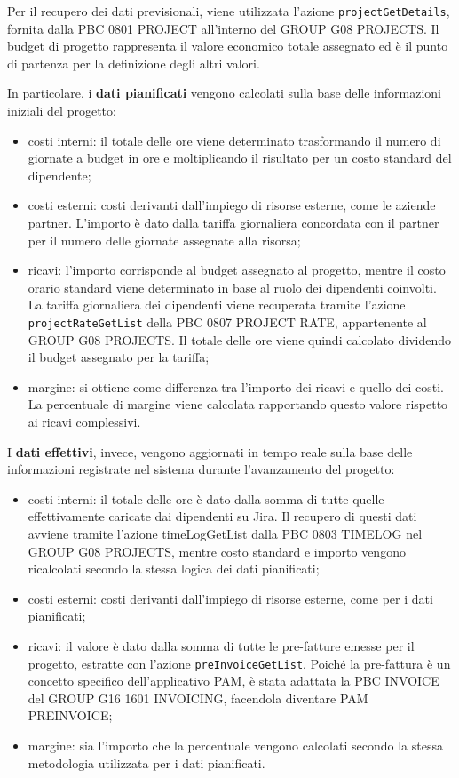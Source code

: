     Per il recupero dei dati previsionali, viene utilizzata l’azione \texttt{projectGetDetails}, fornita dalla PBC 0801 PROJECT
    all’interno del GROUP G08 PROJECTS. Il budget di progetto rappresenta il valore economico totale assegnato ed è
    il punto di partenza per la definizione degli altri valori.

    In particolare, i \textbf{dati pianificati} vengono calcolati sulla base delle informazioni iniziali del progetto:
    \begin{itemize}
        \item costi interni: il totale delle ore viene determinato trasformando il numero di giornate a budget in ore e
        moltiplicando il risultato per un costo standard del dipendente;
        \item costi esterni: costi derivanti dall’impiego di risorse esterne, come le aziende partner. L’importo è dato
        dalla tariffa giornaliera concordata con il partner per il numero delle giornate assegnate alla risorsa;
        \item ricavi: l’importo corrisponde al budget assegnato al progetto, mentre il costo orario standard viene
        determinato in base al ruolo dei dipendenti coinvolti. La tariffa giornaliera dei dipendenti viene recuperata
        tramite l’azione \texttt{projectRateGetList} della PBC 0807 PROJECT RATE, appartenente al GROUP G08 PROJECTS. Il totale
        delle ore viene quindi calcolato dividendo il budget assegnato per la tariffa;
        \item margine: si ottiene come differenza tra l’importo dei ricavi e quello dei costi. La percentuale di margine
        viene calcolata rapportando questo valore rispetto ai ricavi complessivi.
    \end{itemize}

    I \textbf{dati effettivi}, invece, vengono aggiornati in tempo reale sulla base delle informazioni registrate nel sistema
    durante l’avanzamento del progetto:
    \begin{itemize}
        \item costi interni: il totale delle ore è dato dalla somma di tutte quelle effettivamente caricate dai
        dipendenti su Jira. Il recupero di questi dati avviene tramite l’azione timeLogGetList dalla PBC 0803 TIMELOG
        nel GROUP G08 PROJECTS, mentre costo standard e importo vengono ricalcolati secondo la stessa logica dei dati pianificati;
        \item costi esterni: costi derivanti dall’impiego di risorse esterne, come per i dati pianificati;
        \item ricavi: il valore è dato dalla somma di tutte le pre-fatture emesse per il progetto, estratte con l’azione
        \texttt{preInvoiceGetList}. Poiché la pre-fattura
        è un concetto specifico dell’applicativo \ac{PAM}, è stata adattata la PBC INVOICE del GROUP G16 1601 INVOICING,
        facendola diventare PAM PREINVOICE;
        \item margine: sia l’importo che la percentuale vengono calcolati secondo la stessa metodologia utilizzata per i dati pianificati.
    \end{itemize}

